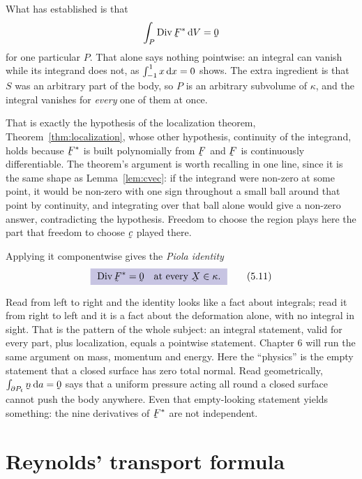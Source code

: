 What  has established is that
\[
   \int_{P}\Dvg\bF^{*}\,\dl V=\bze
\]
for one particular $P$. That alone says nothing pointwise: an integral can
vanish while its integrand does not, as $\int_{-1}^{1}x\,\mathrm{d} x=0$ shows.
The extra ingredient is that $S$ was an arbitrary part of the body, so $P$
is an arbitrary subvolume of $\kappa$, and the integral vanishes for
\emph{every} one of them at once.

That is exactly the hypothesis of the localization theorem,
Theorem~\ref{thm:localization}, whose other hypothesis, continuity of the
integrand, holds because $\bF^{*}$ is built polynomially from $\bF$ and
$\bF$ is continuously differentiable. The theorem's argument is worth
recalling in one line, since it is the same shape as
Lemma~\ref{lem:cvec}: if the integrand were non-zero at some point, it
would be non-zero with one sign throughout a small ball around that point
by continuity, and integrating over that ball alone would give a non-zero
answer, contradicting the hypothesis. Freedom to choose the region plays
here the part that freedom to choose $\bc$ played there.

Applying it componentwise gives the \emph{Piola identity}
\begin{equation}
   \boxed{\ \Dvg\bF^{*}=\bze\quad\text{at every }\bX\in\kappa.\ }
   \tag{5.11}\label{eq:5.11}
\end{equation}

\begin{remark}\label{rem:piolawhat}
Read  from left to right and the identity looks like a fact about
integrals; read it from right to left and it is a fact about the
deformation alone, with no integral in sight. That is the pattern of the
whole subject: an integral statement, valid for every part, plus
localization, equals a pointwise statement. Chapter 6 will run the same
argument on mass, momentum and energy. Here the ``physics'' is the empty
statement that a closed surface has zero total normal. Read geometrically,
$\int_{\partial P_{t}}\bn\,\dl a=\bze$ says that a uniform pressure
acting all round a closed surface cannot push the body anywhere. Even
that empty-looking statement yields something: the nine derivatives of $\bF^{*}$ are not independent.
\end{remark}

\section{Reynolds' transport formula}\label{sec:reynolds}

